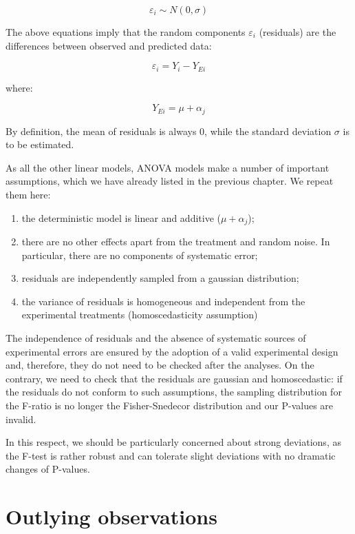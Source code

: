 \documentclass[a4paper,12pt,oneside]{book}
\providecommand{\tightlist}{%
  \setlength{\itemsep}{0pt}\setlength{\parskip}{0pt}}
\begin{document}
\[ \varepsilon_i \sim N(0, \sigma) \]

The above equations imply that the random components \(\varepsilon_i\) (residuals) are the differences between observed and predicted data:

\[\varepsilon_i = Y_i - Y_{Ei}\]

where:

\[Y_{Ei} = \mu + \alpha_j\]

By definition, the mean of residuals is always 0, while the standard deviation \(\sigma\) is to be estimated.

As all the other linear models, ANOVA models make a number of important assumptions, which we have already listed in the previous chapter. We repeat them here:

\begin{enumerate}
\def\labelenumi{\arabic{enumi}.}
\tightlist
\item
  the deterministic model is linear and additive (\(\mu + \alpha_j\));
\item
  there are no other effects apart from the treatment and random noise. In particular, there are no components of systematic error;
\item
  residuals are independently sampled from a gaussian distribution;
\item
  the variance of residuals is homogeneous and independent from the experimental treatments (homoscedasticity assumption)
\end{enumerate}

The independence of residuals and the absence of systematic sources of experimental errors are ensured by the adoption of a valid experimental design and, therefore, they do not need to be checked after the analyses. On the contrary, we need to check that the residuals are gaussian and homoscedastic: if the residuals do not conform to such assumptions, the sampling distribution for the F-ratio is no longer the Fisher-Snedecor distribution and our P-values are invalid.

In this respect, we should be particularly concerned about strong deviations, as the F-test is rather robust and can tolerate slight deviations with no dramatic changes of P-values.

\hypertarget{outlying-observations}{%
\section{Outlying observations}\label{outlying-observations}}
\end{document}
